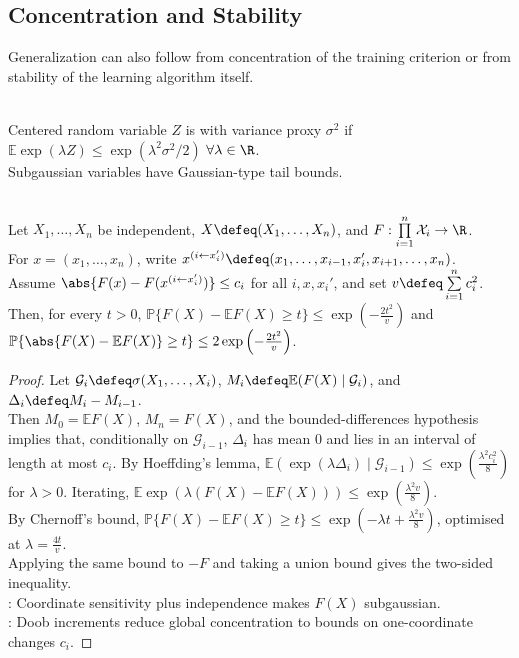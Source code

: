 \subsection{Concentration and Stability}

Generalization can also follow from concentration of the training criterion or from stability of the learning algorithm itself.

\begin{definition} \label{def:sl-subgaussian-random-variable} \\
Centered random variable $Z$ is  with variance proxy $\sigma^2$ if $\mathbb{E}\exp(\lambda Z)\leq \exp(\lambda^2\sigma^2/2)$ $\forall \lambda\in\R$.\\
Subgaussian variables have Gaussian-type tail bounds.
\end{definition}

\begin{theorem} \label{thm:sl-mcdiarmid-form} \\
Let $X_1,\ldots,X_n$ be independent, $X\defeq(X_1,\ldots,X_n)$, and $F:\prod\limits_{i=1}^n\mathcal{X}_i\to\R$.\\
For $x=(x_1,\ldots,x_n)$, write $x^{(i\leftarrow x_i')}\defeq(x_1,\ldots,x_{i-1},x_i',x_{i+1},\ldots,x_n)$.\\
Assume $\abs{F(x)-F(x^{(i\leftarrow x_i')})}\leq c_i$ for all $i,x,x_i'$, and set $v\defeq\sum\limits_{i=1}^nc_i^2$.\\
Then, for every $t>0$, $\mathbb{P}\{F(X)-\mathbb{E}F(X)\geq t\}\leq\exp\left(-\frac{2t^2}{v}\right)$ and $\mathbb{P}\{\abs{F(X)-\mathbb{E}F(X)}\geq t\}\leq2\exp\left(-\frac{2t^2}{v}\right)$.
\begin{proof}
Let $\mathcal{G}_i\defeq\sigma(X_1,\ldots,X_i)$, $M_i\defeq\mathbb{E}(F(X)\mid\mathcal{G}_i)$, and $\Delta_i\defeq M_i-M_{i-1}$.\\
Then $M_0=\mathbb{E}F(X)$, $M_n=F(X)$, and the bounded-differences hypothesis implies that, conditionally on $\mathcal{G}_{i-1}$, $\Delta_i$ has mean $0$ and lies in an interval of length at most $c_i$. By Hoeffding's lemma, $\mathbb{E}(\exp(\lambda\Delta_i)\mid\mathcal{G}_{i-1})\leq\exp\left(\frac{\lambda^2c_i^2}{8}\right)$ for $\lambda>0$. Iterating, $\mathbb{E}\exp(\lambda(F(X)-\mathbb{E}F(X)))\leq\exp\left(\frac{\lambda^2v}{8}\right)$.\\
By Chernoff's bound, $\mathbb{P}\{F(X)-\mathbb{E}F(X)\geq t\}\leq\exp\left(-\lambda t+\frac{\lambda^2v}{8}\right)$, optimised at $\lambda=\frac{4t}{v}$.\\
Applying the same bound to $-F$ and taking a union bound gives the two-sided inequality.\\
: Coordinate sensitivity plus independence makes $F(X)$ subgaussian.\\
: Doob increments reduce global concentration to bounds on one-coordinate changes $c_i$.
\end{proof}
\end{theorem}


